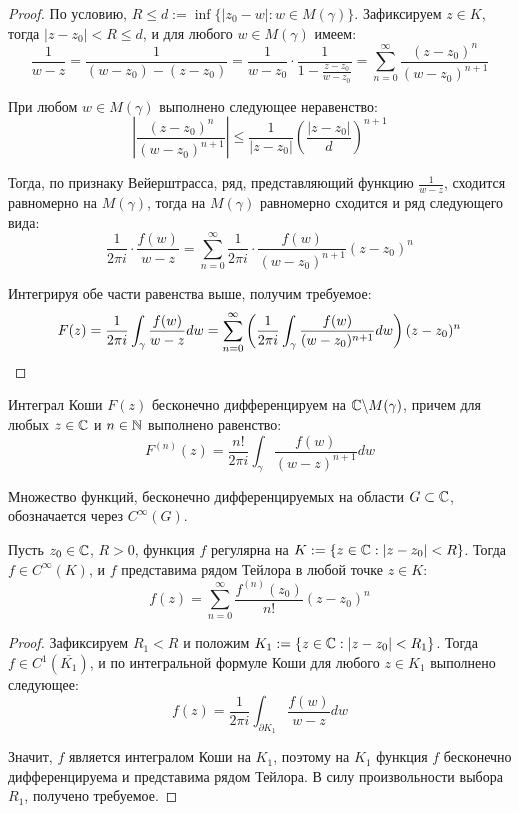 \begin{proof}
	По условию, $R \le d := \inf\{|z_0 - w| : w \in M(\gamma)\}$. Зафиксируем $z \in K$, тогда $|z - z_0| < R \le d$, и для любого $w \in M(\gamma)$ имеем:
	\[\frac1{w - z} = \frac1{(w-z_0) - (z - z_0)} = \frac1{w-z_0}\cdot \frac1{1 - \frac{z-z_0}{w - z_0}} = \sum_{n=0}^\infty\frac{(z-z_0)^n}{(w-z_0)^{n + 1}}\]
	
	При любом $w \in M(\gamma)$ выполнено следующее неравенство:
	\[\left|\frac{(z-z_0)^n}{(w-z_0)^{n + 1}}\right| \le \frac{1}{|z - z_0|}\left(\frac{|z - z_0|}{d}\right)^{n+1}\]
	
	Тогда, по признаку Вейерштрасса, ряд, представляющий функцию $\frac1{w - z}$, сходится равномерно на $M(\gamma)$, тогда на $M(\gamma)$ равномерно сходится и ряд следующего вида:
	\[\frac1{2\pi i} \cdot\frac{f(w)}{w-z} = \sum_{n=0}^\infty\frac1{2\pi i}\cdot \frac{f(w)}{(w-z_0)^{n + 1}}(z-z_0)^n\]
	
	Интегрируя обе части равенства выше, получим требуемое:
	\[F(z) = \frac1{2\pi i} \int_\gamma \frac{f(w)}{w-z}dw = \sum_{n=0}^\infty\left(\frac1{2\pi i} \int_\gamma\frac{f(w)}{(w-z_0)^{n + 1}}dw\right)(z-z_0)^n \qedhere\]
\end{proof}

\begin{corollary}
	Интеграл Коши $F(z)$ бесконечно дифференцируем на $\mathbb{C} \backslash M(\gamma)$, причем для любых $z \in \mathbb{C}$ и $n \in \mathbb{N}$ выполнено равенство:
	\[F^{(n)}(z) = \frac{n!}{2\pi i} \int_\gamma\frac{f(w)}{(w-z)^{n + 1}}dw\]
\end{corollary}

\begin{definition}
	Множество функций, бесконечно дифференцируемых на области $G \subset \mathbb{C}$, обозначается через $C^\infty(G)$.
\end{definition}

\begin{theorem}
	Пусть $z_0 \in \mathbb{C}$, $R > 0$, функция $f$ регулярна на $K := \{z \in \mathbb{C} : |z - z_0| < R\}$. Тогда $f \in C^\infty(K)$, и $f$ представима рядом Тейлора в любой точке $z \in K$:
	\[f(z) = \sum_{n = 0}^\infty \frac{f^{(n)}(z_0)}{n!}(z - z_0)^n\]
\end{theorem}

\begin{proof}
	Зафиксируем $R_1 < R$ и положим $K_1 := \{z \in \mathbb{C}: |z - z_0| < R_1\}$. Тогда $f \in C^1(\overline{K_1})$, и по интегральной формуле Коши для любого $z \in K_1$ выполнено следующее:
	\[f(z) = \frac{1}{2\pi i}\int_{\partial K_1}\frac{f(w)}{w - z}dw\]
	
	Значит, $f$ является интегралом Коши на $K_1$, поэтому на $K_1$ функция $f$ бесконечно дифференцируема и представима рядом Тейлора. В силу произвольности выбора $R_1$, получено требуемое.
\end{proof}

